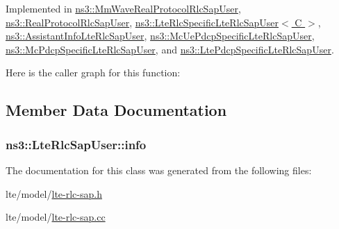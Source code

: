 Implemented in \hyperlink{classns3_1_1MmWaveRealProtocolRlcSapUser_a0bcc3ec114d32f50314dfcc4ac1e8773}{ns3\+::\+Mm\+Wave\+Real\+Protocol\+Rlc\+Sap\+User}, \hyperlink{classns3_1_1RealProtocolRlcSapUser_acfc478ba01b9c759792a84712c9d962b}{ns3\+::\+Real\+Protocol\+Rlc\+Sap\+User}, \hyperlink{classns3_1_1LteRlcSpecificLteRlcSapUser_a6b11f326d17e535464b90c2858cce7f1}{ns3\+::\+Lte\+Rlc\+Specific\+Lte\+Rlc\+Sap\+User$<$ C $>$}, \hyperlink{classns3_1_1AssistantInfoLteRlcSapUser_ae567550ef2c16893536205d98cfce7b4}{ns3\+::\+Assistant\+Info\+Lte\+Rlc\+Sap\+User}, \hyperlink{classns3_1_1McUePdcpSpecificLteRlcSapUser_a6914bc2f13dac5b835836a31e2e4f955}{ns3\+::\+Mc\+Ue\+Pdcp\+Specific\+Lte\+Rlc\+Sap\+User}, \hyperlink{classns3_1_1McPdcpSpecificLteRlcSapUser_aa243f787760f63f72961f3f76232a3d0}{ns3\+::\+Mc\+Pdcp\+Specific\+Lte\+Rlc\+Sap\+User}, and \hyperlink{classns3_1_1LtePdcpSpecificLteRlcSapUser_a380aa87c6a12b4673d773d922ca4572b}{ns3\+::\+Lte\+Pdcp\+Specific\+Lte\+Rlc\+Sap\+User}.



Here is the caller graph for this function\+:




\subsection{Member Data Documentation}
\subsubsection[{\texorpdfstring{info}{info}}]{ ns3\+::\+Lte\+Rlc\+Sap\+User\+::info}\hypertarget{classns3_1_1LteRlcSapUser_ae5c93c1d5c538c4f8cec3ad4ecbd898a}{}\label{classns3_1_1LteRlcSapUser_ae5c93c1d5c538c4f8cec3ad4ecbd898a}


The documentation for this class was generated from the following files\+:\begin{DoxyCompactItemize}
\item 
lte/model/\hyperlink{lte-rlc-sap_8h}{lte-\/rlc-\/sap.\+h}\item 
lte/model/\hyperlink{lte-rlc-sap_8cc}{lte-\/rlc-\/sap.\+cc}\end{DoxyCompactItemize}
